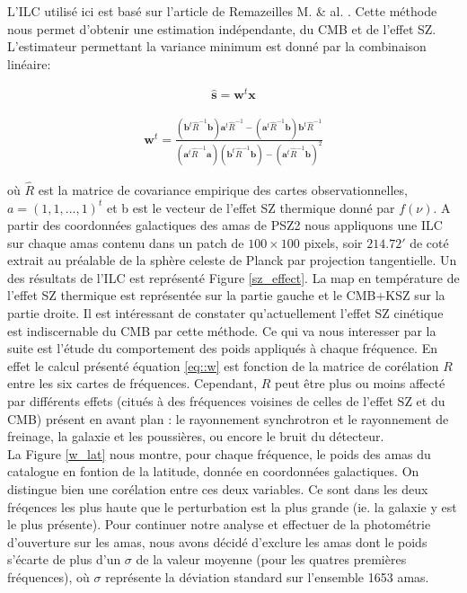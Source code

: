 \documentclass[a4paper,11pt]{article}
\begin{document}
L'ILC utilisé ici est basé sur l'article de Remazeilles M. \&
al. \cite{Remazeilles}. Cette méthode nous permet d'obtenir  une
estimation indépendante, du CMB et de l'effet SZ. L'estimateur
permettant la variance minimum est donné par la combinaison linéaire: 

\begin{align*}
  \widehat{\textbf{s}} = \textbf{w}^t \textbf{x}
\end{align*}

\begin{align}
  \label{eq::w}
  \textbf{w}^t = \frac{\left( \textbf{b}^t\widehat{R}^{-1} \textbf{b}
    \right) \textbf{a}^t \widehat{R}^{-1} - \left( \textbf{a}^t\widehat{R}^{-1} \textbf{b}
    \right) \textbf{b}^t \widehat{R}^{-1}}{\left( \textbf{a}^t\widehat{R}^{-1} \textbf{a}
    \right) \left( \textbf{b}^t\widehat{R}^{-1} \textbf{b}
    \right) - \left( \textbf{a}^t\widehat{R}^{-1} \textbf{b}
    \right)^2}
\end{align}

où $\widehat{R}$ est la matrice de covariance empirique des cartes
observationnelles, $a = (1, 1, ..., 1)^t$ et b est le vecteur de
l'effet SZ thermique donné par $f(\nu)$. A partir des coordonnées
galactiques des amas de PSZ2 nous appliquons une ILC sur chaque amas
contenu dans un patch de $100 \times 100$ pixels, soir $214.72 '$ de
coté extrait au préalable de la sphère celeste de Planck par
projection tangentielle. 
Un des résultats de l'ILC est représenté Figure \ref{sz_effect}. La
map en température de l'effet SZ thermique est représentée sur la
partie gauche et le CMB+KSZ sur la partie droite. Il est intéressant de
constater qu'actuellement l'effet SZ cinétique est indiscernable du
CMB par cette méthode.  
Ce qui va nous interesser par la suite est l'étude du comportement des
poids appliqués à chaque fréquence. En effet le calcul présenté
équation \eqref{eq::w} est fonction de la matrice de corélation $R$ entre
les six cartes de fréquences. Cependant, $R$ peut être plus ou moins affecté par
différents effets (citués à des fréquences voisines de celles de l'effet SZ et
du CMB) présent en avant plan : le rayonnement synchrotron et le
rayonnement de freinage, la galaxie et les poussières, ou encore le bruit du
détecteur.  \\

La Figure \ref{w_lat} nous montre, pour chaque fréquence, le poids
des amas du catalogue en fontion de la latitude, donnée en coordonnées
galactiques. On distingue bien une corélation entre ces deux
variables. Ce sont dans les deux fréqences les plus haute que le
perturbation est la plus grande (ie. la galaxie y est le plus
présente). Pour continuer notre analyse et effectuer de la photométrie
d'ouverture sur les amas, nous avons décidé d'exclure les amas dont
le poids s'écarte de plus d'un $\sigma$ de la valeur moyenne (pour les
quatres premières fréquences), où $\sigma$ représente la déviation
standard sur l'ensemble 1653 amas. \\
\end{document}
